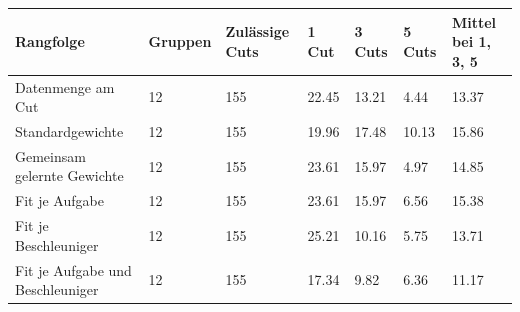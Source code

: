 \begin{tabular}{@{}lllllll@{}}
\toprule
Rangfolge & Gruppen & Zulässige Cuts & 1 Cut & 3 Cuts & 5 Cuts & Mittel bei 1, 3, 5 \\
\midrule
Datenmenge am Cut & 12 & 155 & 22.45 & 13.21 & 4.44 & 13.37 \\
Standardgewichte & 12 & 155 & 19.96 & 17.48 & 10.13 & 15.86 \\
Gemeinsam gelernte Gewichte & 12 & 155 & 23.61 & 15.97 & 4.97 & 14.85 \\
Fit je Aufgabe & 12 & 155 & 23.61 & 15.97 & 6.56 & 15.38 \\
Fit je Beschleuniger & 12 & 155 & 25.21 & 10.16 & 5.75 & 13.71 \\
Fit je Aufgabe und Beschleuniger & 12 & 155 & 17.34 & 9.82 & 6.36 & 11.17 \\
\bottomrule
\end{tabular}
